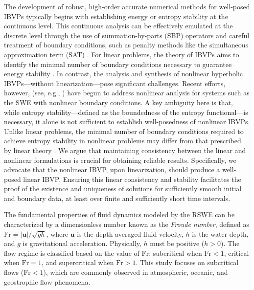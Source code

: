 \documentclass{article}
\numberwithin{equation}{section}
\theoremstyle{definition}
\begin{document}
The development of robust, high-order accurate numerical methods for well-posed IBVPs typically begins with establishing energy or entropy stability at the continuous level. This continuous analysis can be effectively emulated at the discrete level through the use of summation-by-parts (SBP) operators \cite{kreiss1974finite,BStrand1994,gassner2013skew,mattsson2017diagonal,williams2021provably} and careful treatment of boundary conditions, such as penalty methods like the simultaneous approximation term (SAT) \cite{carpenter1994time,Mattsson2003,HEW2025113624}.
%
For linear problems, the theory of IBVPs aims to identify the minimal number of boundary conditions necessary to guarantee energy stability \cite{nordstrom2022linear,GHADER20141,HEW2025113624}. In contrast, the analysis and synthesis of nonlinear hyperbolic IBVPs—without linearization—pose significant challenges. Recent efforts, however, (see, e.g., \cite{nordstrom2022nonlinear,nordstrom2024nonlinear}) have begun to address nonlinear analysis for systems such as the SWE with nonlinear boundary conditions. A key ambiguity here is that, while entropy stability—defined as the boundedness of the entropy functional—is necessary, it alone is not sufficient to establish well-posedness of nonlinear IBVPs.
%
Unlike linear problems, the minimal number of boundary conditions required to achieve entropy stability in nonlinear problems may differ from that prescribed by linear theory \cite{GHADER20141,gustafsson1995time}. We argue that maintaining consistency between the linear and nonlinear formulations is crucial for obtaining reliable results. Specifically, we advocate that the nonlinear IBVP, upon linearization, should produce a well-posed linear IBVP. Ensuring this linear consistency and stability facilitates the proof of the existence and uniqueness of solutions for sufficiently smooth initial and boundary data, at least over finite and sufficiently short  time intervals.
% 


The fundamental properties of fluid dynamics modeled by the RSWE can be characterized by a dimensionless number known as the \textit{Froude number}, defined as $\textrm{Fr} = |\mathbf{u}|/\sqrt{gh}$, where $\mathbf{u}$ is the depth-averaged fluid velocity, $h$ is the water depth, and $g$ is gravitational acceleration. Physically, $h$ must be positive ($h>0$). The flow regime is classified based on the value of $\textrm{Fr}$: subcritical when $\textrm{Fr} < 1$, critical when $\textrm{Fr} = 1$, and supercritical when $\textrm{Fr} >1$. This study focuses on subcritical flows ($\textrm{Fr} <1$), which are commonly observed in atmospheric, oceanic, and geostrophic flow phenomena.
%
\end{document}
